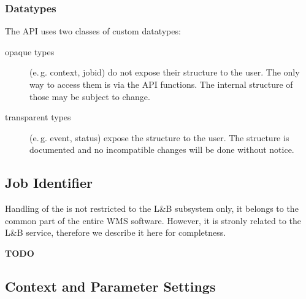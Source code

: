\documentclass{egee}
\def\LB{L\&B\xspace}
\def\eg{e.\,g.\xspace}
\begin{document}
\subsubsection{Datatypes}
The API uses two classes of custom datatypes:
\begin{description}
\item[opaque types] (\eg context, jobid) do not expose their structure
to the user.
The only way to access them is via the API functions.
The internal structure of those may be subject to change.

\item[transparent types] (\eg event, status) expose the structure to the
user. The structure is documented and no incompatible changes will be done
without notice.
\end{description}

\subsection{Job Identifier}
Handling of the \jobid is not restricted to the \LB subsystem only,
it belongs to the common part of the entire WMS software.
However, it is stronly related to the \LB service, therefore we describe
it here for completness.

\textbf{TODO}

\iffalse
\subsubsection{Interface}

\subsubsection{Datatypes}
\begin{description}
\tti[edg_wlc_JobId] Representation of the \jobid.
Opaque type, it's contents is hidden to the API users and should be
manipulated with the access methods only.
\end{description}
\subsubsection{Functions}
\fi




\subsection{Context and Parameter Settings}
\label{s:context}
\end{document}
